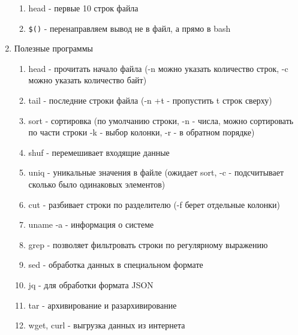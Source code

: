 \documentclass[a4paper, 12pt]{article}
\begin{document}
\begin{enumerate}
\begin{enumerate}
    \item head - первые 10 строк файла 
    \item \verb+$()+ - перенаправляем вывод не в файл, а прямо в bash
  \end{enumerate}
  \item Полезные программы
  \begin{enumerate}
    \item head - прочитать начало файла (-n можно указать количество строк, -c можно указать количество байт)
    \item tail - последние строки файла (-n +t - пропустить t строк сверху)
    \item sort - сортировка (по умолчанию строки, -n - числа, можно сортировать по части строки -k - выбор колонки, -r - в обратном порядке)
    \item shuf - перемешивает входящие данные
    \item uniq - уникальные значения в файле (ожидает sort, -c - подсчитывает сколько было одинаковых элементов)
    \item cut - разбивает строки по разделителю (-f берет отдельные колонки)
    \item uname -a - информация о системе
    \item grep - позволяет фильтровать строки по регулярному выражению
    \item sed - обработка данных в специальном формате
    \item jq - для обработки формата JSON
    \item tar - архивирование и разархивирование
    \item wget, curl - выгрузка данных из интернета
  \end{enumerate}
\end{enumerate}
\end{document}
